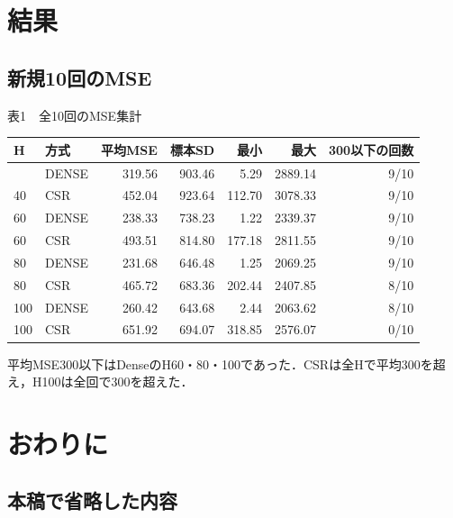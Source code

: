 \documentclass[
  10pt,
  a4paper,
]{article}
\begin{document}

\section{結果}\label{ux7d50ux679c}

\subsection{新規10回のMSE}\label{ux65b0ux898f10ux56deux306emse}

\begingroup\centering\setlength{\parindent}{0pt}

表1　全10回のMSE集計

\par\endgroup

\begin{longtable}[]{@{}llrrrrr@{}}
\toprule\noalign{}
H & 方式 & 平均MSE & 標本SD & 最小 & 最大 & 300以下の回数 \\
\midrule\noalign{}
\endhead
\bottomrule\noalign{}
\endlastfoot
40 & DENSE & 319.56 & 903.46 & 5.29 & 2889.14 & 9/10 \\
40 & CSR & 452.04 & 923.64 & 112.70 & 3078.33 & 9/10 \\
60 & DENSE & 238.33 & 738.23 & 1.22 & 2339.37 & 9/10 \\
60 & CSR & 493.51 & 814.80 & 177.18 & 2811.55 & 9/10 \\
80 & DENSE & 231.68 & 646.48 & 1.25 & 2069.25 & 9/10 \\
80 & CSR & 465.72 & 683.36 & 202.44 & 2407.85 & 8/10 \\
100 & DENSE & 260.42 & 643.68 & 2.44 & 2063.62 & 8/10 \\
100 & CSR & 651.92 & 694.07 & 318.85 & 2576.07 & 0/10 \\
\end{longtable}

平均MSE300以下はDenseのH60・80・100であった．CSRは全Hで平均300を超え，H100は全回で300を超えた．

\section{おわりに}\label{ux304aux308fux308aux306b}

\subsection{本稿で省略した内容}\label{ux672cux7a3fux3067ux7701ux7565ux3057ux305fux5185ux5bb9}
\end{document}
